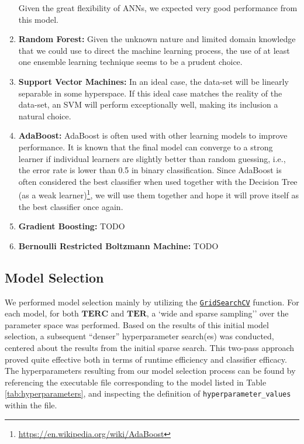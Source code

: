 \documentclass{article}
\newcommand{\TER}{\ensuremath{\mathbf{TER}}\xspace}
\newcommand{\TERC}{\ensuremath{\mathbf{TERC}}\xspace}
\begin{document}
\begin{enumerate}
	Given the great flexibility of ANNs, we expected very good performance from this model.
	\item
	\textbf{Random Forest:} Given the unknown nature and limited domain knowledge that we could use to direct the machine learning process, the use of at least one ensemble learning technique seems to be a prudent choice.
	\item
	\textbf{Support Vector Machines:} In an ideal case, the data-set will be linearly separable in some hyperspace.
	If this ideal case matches the reality of the data-set, an SVM will perform exceptionally well, making its inclusion a natural choice.
	\item
	\textbf{AdaBoost:} AdaBoost is often used with other learning models to improve performance. It is known that the final model can converge to a strong learner if individual learners are slightly better than random guessing, i.e., the error rate is lower than 0.5 in binary classification. Since AdaBoost is often considered the best classifier when used together with the Decision Tree (as a weak learner)\footnote{\url{https://en.wikipedia.org/wiki/AdaBoost}}, we will use them together and hope it will prove itself as the best classifier once again.
	\item
	\textbf{Gradient Boosting:} TODO 
	\item
	\textbf{Bernoulli Restricted Boltzmann Machine:} TODO

	
\end{enumerate}


\hypertarget{model-selection}{%
\subsection{Model Selection}\label{model-selection}}

We performed model selection mainly by utilizing the \href{https://scikit-learn.org/stable/modules/generated/sklearn.model_selection.GridSearchCV.html}{\texttt{GridSearchCV}} function.
For each model, for both \TERC and \TER, a `wide and sparse sampling'' over the parameter space was performed.
Based on the results of this initial model selection, a subsequent ``denser'' hyperparameter search(es) was conducted, centered about the results from the initial sparse search.
This two-pass approach proved quite effective both in terms of runtime efficiency and classifier efficacy.
The hyperparameters resulting from our model selection process can be found by referencing the executable file corresponding to the model listed in Table \ref{tab:hyperparameters}, and inspecting the definition of \texttt{hyperparameter\_values} within the file.
\end{document}
